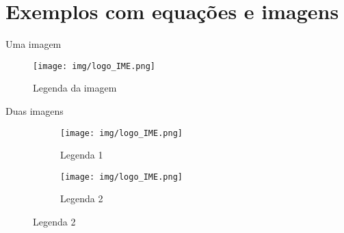 \section{Exemplos com equações e imagens} %


\begin{frame}{Uma imagem}
   \begin{figure}[h]
       \centering
       \texttt{[image: img/logo\_IME.png]}
       \caption{Legenda da imagem}
       \label{fig:label_da_imagem}
   \end{figure}
\end{frame}


\begin{frame}{Duas imagens}
   \begin{figure}
       \centering
       \begin{subfigure}[b]{0.45\textwidth}
           \centering
           \texttt{[image: img/logo\_IME.png]}
           \caption{Legenda 1}
           \label{fig:img1}
       \end{subfigure}
       \hfill
       \begin{subfigure}[b]{0.45\textwidth}
           \centering
           \texttt{[image: img/logo\_IME.png]}
           \caption{Legenda 2}
           \label{fig:img2}
       \end{subfigure}
   \end{figure}
\end{frame}

